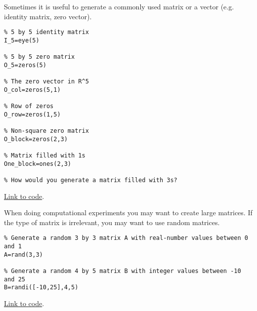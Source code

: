 \documentclass{ximera}
\begin{document}
\begin{template}\label{temp:id_matrix}
Sometimes it is useful to generate a commonly used matrix or a vector (e.g. identity matrix, zero vector). 
\begin{verbatim}
% 5 by 5 identity matrix
I_5=eye(5)

% 5 by 5 zero matrix
O_5=zeros(5)

% The zero vector in R^5
O_col=zeros(5,1)

% Row of zeros
O_row=zeros(1,5)

% Non-square zero matrix
O_block=zeros(2,3)

% Matrix filled with 1s
One_block=ones(2,3)

% How would you generate a matrix filled with 3s?
\end{verbatim}

\href{https://sagecell.sagemath.org/?z=eJxdzj0PgjAQBuCdhP9wC4kmOCBhNK46qAlx1vBxSGPtxbZY66-XYiHqcsPdc-9dBBmUti-sRqGZtnArtGTPMNiesxVanGXzMAiDaHQvlDSZQ29cQ03q2OKHPLDSJIEJyE-ZkxXx0caJ1zkZoGZYUM5IMt4k8Zi4J7FQ966Q-H-75FRdvV_Gqfe7YQ4N4xxrMEy3kLhwgX6BBH77Tf-DoY7XYKmDCwqUhUYo_KGfoFSt342kXHo=&lang=octave&interacts=eJyLjgUAARUAuQ==}{Link to code}.
\end{template}

\begin{template}\label{temp:randMat}
    When doing computational experiments you may want to create large matrices.  If the type of matrix is irrelevant, you may want to use random matrices.

    \begin{verbatim}
% Generate a random 3 by 3 matrix A with real-number values between 0 and 1
A=rand(3,3)

% Generate a random 4 by 5 matrix B with integer values between -10 and 25
B=randi([-10,25],4,5)
    \end{verbatim}

\href{https://sagecell.sagemath.org/?z=eJxtzLEKwjAUheE9kHc4S6GFFGzTjA7t0ocQhxu8aKCJEFNb397U4qTLGX44X4GRA0dKDEKkcLl7aNhXHk8puhU9FpduiExTHWZvOeJJ08wPWE4Lc8AB-YdGiv64CaVWupJCiuKP3W22-drDbruQ-Prr1s0ut0aK4UO78pSjas1ZdcpUb3XOOqE=&lang=octave&interacts=eJyLjgUAARUAuQ==}{Link to code}.    
\end{template}
\end{document}

